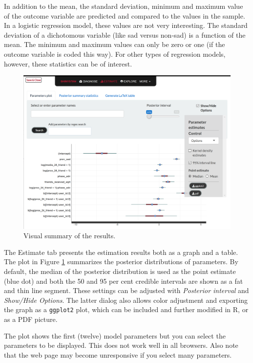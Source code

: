 \documentclass[doc]{apa6}
\begin{document}
In addition to the mean, the standard deviation, minimum and maximum
value of the outcome variable are predicted and compared to the values
in the sample. In a logistic regression model, these values are not very
interesting. The standard deviation of a dichotomous variable (like sad
versus non-sad) is a function of the mean. The minimum and maximum
values can only be zero or one (if the outcome variable is coded this
way). For other types of regression models, however, these statistics
can be of interest.

\begin{figure}[H]
\includegraphics[width=1\linewidth]{shinystan5} \caption{Visual summary of the results.}\label{fig:shinystanshot5}
\end{figure}

The Estimate tab presents the estimation results both as a graph and a
table. The plot in Figure \ref{fig:shinystanshot5} summarizes the
posterior distributions of parameters. By default, the median of the
posterior distribution is used as the point estimate (blue dot) and both
the 50 and 95 per cent credible intervals are shown as a fat and thin
line segment. These settings can be adjusted with \emph{Posterior
interval} and \emph{Show/Hide Options}. The latter dialog also allows
color adjustment and exporting the graph as a \texttt{ggplot2} plot,
which can be included and further modified in R, or as a PDF picture.

The plot shows the first (twelve) model parameters but you can select
the parameters to be displayed. This does not work well in all browsers.
Also note that the web page may become unresponsive if you select many
parameters.
\end{document}
